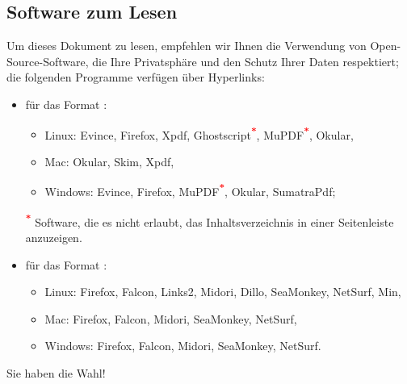 \subsection{Software zum Lesen\label{introduction-manual-readers}}

Um dieses Dokument zu lesen, empfehlen wir Ihnen die Verwendung von Open-Source-Software, die Ihre Privatsphäre und den Schutz Ihrer Daten respektiert; die folgenden Programme verfügen über \gls{Hyperlinks}: 
\begin{itemize}
	\item für das Format :%
		\begin{itemize}
			\item[\textopenbullet] Linux: Evince, Firefox, Xpdf, Ghostscript\textsuperscript{\textcolor{red}{\textbf{*}}}, MuPDF\textsuperscript{\textcolor{red}{\textbf{*}}}, Okular,
			\item[\textopenbullet] Mac: Okular, Skim, Xpdf,
			\item[\textopenbullet] Windows: Evince, Firefox, MuPDF\textsuperscript{\textcolor{red}{\textbf{*}}}, Okular, SumatraPdf;
		\end{itemize}
		\textsuperscript{\textcolor{red}{\textbf{*}}} Software, die es nicht erlaubt, das Inhaltsverzeichnis in einer Seitenleiste anzuzeigen.%
	\item für das Format :%
		\begin{itemize}
			\item[\textopenbullet] Linux: Firefox, Falcon, Links2, Midori, Dillo, SeaMonkey, NetSurf, Min,
			\item[\textopenbullet] Mac: Firefox, Falcon, Midori, SeaMonkey, NetSurf,
			\item[\textopenbullet] Windows: Firefox, Falcon, Midori, SeaMonkey, NetSurf.
		\end{itemize}
\end{itemize}

Sie haben die Wahl!%

